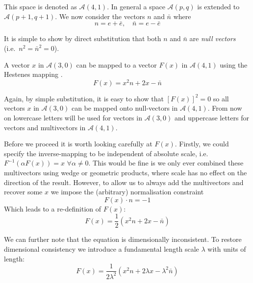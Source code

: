 This space is denoted as $\mathcal{A}(4,1)$. In general a 
space $\mathcal{A}(p,q)$ is extended to $\mathcal{A}(p+1,q+1)$.
We now consider the vectors $n$ and $\bar{n}$ where
\begin{displaymath}
n = e + \bar{e}, \quad \bar{n} = e - \bar{e}
\end{displaymath}

It is simple to show by direct substitution that both $n$ and $\bar{n}$ are
\emph{null vectors} (i.e.\ $n^2 = \bar{n}^2 = 0$).

A vector $x$ in $\mathcal{A}(3,0)$ can be mapped to a vector $F(x)$ in $\mathcal{A}(4,1)$
using the Hestenes mapping \cite{hestenes}.
\begin{displaymath}
F(x) = x^2n + 2x - \bar{n}
\end{displaymath}


Again, by simple substitution, it is easy to show that $[F(x)]^2 = 0$ so all vectors
$x$ in $\mathcal{A}(3,0)$ can be mapped onto null-vectors in $\mathcal{A}(4,1)$.
From now on lowercase letters will be used for vectors in $\mathcal{A}(3,0)$ and
uppercase letters for vectors and multivectors in $\mathcal{A}(4,1)$.

Before we proceed it is worth looking carefully at $F(x)$. Firstly,
we could specify the inverse-mapping to be independent of absolute
scale, i.e. $F^{-1}(\alpha F(x)) = x$ $\forall \alpha \ne 0$.
This would be fine is we only ever combined these multivectors using
wedge or geometric products, where scale has no effect on the direction
of the result. However, to allow us to always add the multivectors and
recover some $x$ we impose the (arbitrary) normalisation constraint
\[
F(x) \cdot n = -1
\]
Which leads to a re-definition of $F(x)$:
\begin{displaymath}
F(x) = \frac{1}{2}(x^2n + 2x - \bar{n})
\end{displaymath}

We can further note that the equation is dimensionally inconsistent. To
restore dimensional consistency we introduce a fundamental length scale
$\lambda$ with units of length:
\begin{displaymath}
F(x) = \frac{1}{2\lambda^2}(x^2n + 2\lambda x - \lambda^2 \bar{n})
\end{displaymath}

